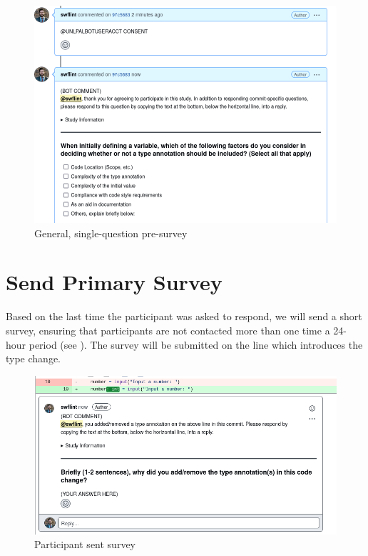 \documentclass[paper=letter,fontsize=11pt,DIV=14]{scrartcl}
\begin{document}
\begin{figure}[h]
\centering
\includegraphics[width=\linewidth,frame]{./presurvey.png}
\caption{General, single-question pre-survey}
\label{fig:general-survey}
\end{figure}

\section{Send Primary Survey}
\label{send-primary-survey}

Based on the last time the participant was asked to respond, we will send a short survey, ensuring that participants are not contacted more than one time a 24-hour period (see ).
The survey will be submitted on the line which introduces the type change.

\begin{figure}[h]
\centering
\includegraphics[width=\linewidth,frame]{./survey-sent.png}
\caption{Participant sent survey}\label{fig:survey}
\end{figure}
\end{document}
